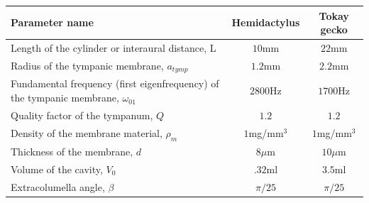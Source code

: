 \begin{minipage}{\linewidth}
\renewcommand{\arraystretch}{1.2}
\centering
{} \label{geckogeometricparams} 
\begin{tabular}{|p{8 cm} | c | c|}
\hline
Parameter name & Hemidactylus & Tokay gecko\\
\hline
Length of the cylinder or interaural distance, L & $10$mm & $22$mm\\
Radius of the tympanic membrane, $a_{tymp}$& $1.2$mm & $2.2$mm\\
Fundamental frequency (first eigenfrequency) of the tympanic membrane, $\omega_{01}$ & $2800$Hz & $1700$Hz\\
Quality factor of the tympanum, $Q$ & $1.2$ &  $1.2$\\
Density of the membrane material, $\rho_m$ & $1$mg/mm$^3$ & $1$mg/mm$^3$\\
Thickness of the membrane, $d$& $8\mu$m & $10\mu$m\\
Volume of the cavity, $V_0$ & $.32$ml & $3.5$ml\\ 
Extracolumella angle, $\beta$ & $\pi/25$ & $\pi/25$\\
\hline
\end {tabular}\par
\bigskip
\end{minipage}
